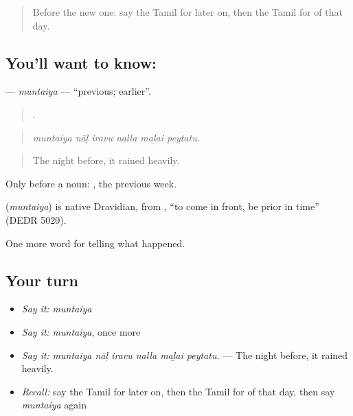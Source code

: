 \label{lesson:TA-C316-muntaiya}



\begin{quote}
Before the new one: say the Tamil for later on, then the Tamil for of that day.
\end{quote}

\subsection*{You'll want to know: }
\textbf{} — \emph{muntaiya} — \textquotedblleft{}previous; earlier\textquotedblright{}.

\begin{quote}
     .
\end{quote}

\begin{quote}
\emph{muntaiya nāḷ iravu nalla maḻai peytatu.}
\end{quote}

\begin{quote}
The night before, it rained heavily.
\end{quote}

Only before a noun:  , the previous week.

\begin{cousinweb}
\textbf{} (\emph{muntaiya}) is native Dravidian, from , \textquotedblleft{}to come in front, be prior in time\textquotedblright{} (DEDR 5020).
\end{cousinweb}

\begin{grammarlens}[title={What you've built}]
One more word for telling what happened.
\end{grammarlens}

\subsection*{Your turn}
\begin{itemize}
\raggedright
  \item \emph{Say it:} \emph{muntaiya}
  \item \emph{Say it:} \emph{muntaiya}, once more
  \item \emph{Say it:} \emph{muntaiya nāḷ iravu nalla maḻai peytatu.} — The night before, it rained heavily.
  \item \emph{Recall:} say the Tamil for later on, then the Tamil for of that day, then say \emph{muntaiya} again
\end{itemize}

